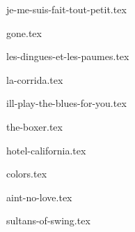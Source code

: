 \begin{songs}{}

  {je-me-suis-fait-tout-petit.tex}
  \sclearpage

  {gone.tex}
  \sclearpage

  {les-dingues-et-les-paumes.tex}
  \sclearpage

  {la-corrida.tex}
  \sclearpage

  {ill-play-the-blues-for-you.tex}
  \sclearpage

  {the-boxer.tex}
  \sclearpage

  {hotel-california.tex}
  \sclearpage

  {colors.tex}
  \sclearpage

  {aint-no-love.tex}
  \sclearpage

  {sultans-of-swing.tex}
  \sclearpage

 \end{songs}
